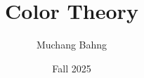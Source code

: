 \documentclass{article}
\begin{document}
\title{Color Theory}
\author{Muchang Bahng}
\date{Fall 2025}

\maketitle
\tableofcontents
\pagebreak





\end{document}

